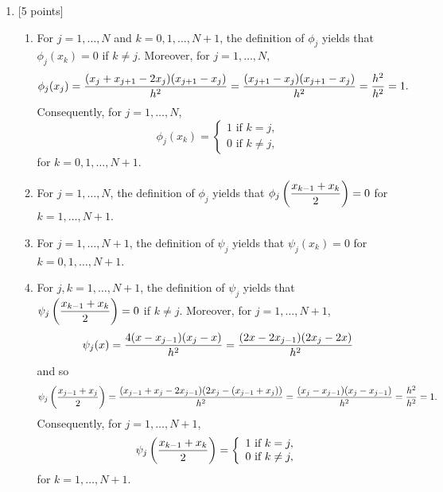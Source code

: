 \begin{solution}
\begin{enumerate}
\item {[5 points]}
\begin{enumerate}
\item For $j=1,\ldots,N$ and $k=0,1,\ldots,N+1$, the definition of $\phi_j$ yields that $\phi_j(x_k)=0$ if $k\ne j$. Moreover, for $j=1,\ldots,N$,
\[
\phi_j(x_j)={(x_j+x_{j+1}-2x_j)(x_{j+1}-x_j) \over h^2}={(x_{j+1}-x_j)(x_{j+1}-x_j) \over h^2}={h^2 \over h^2}=1.
\]
Consequently, for $j=1,\ldots,N$,
\[ \phi_j(x_k) = \left\{ \begin{array}{l}
1\mbox{ if }k=j, \\
0\mbox{ if }k\ne j,
\end{array}\right. \]
for $k=0,1,\ldots,N+1$.

\item For $j=1,\ldots,N$, the definition of $\phi_j$ yields that $\displaystyle{\phi_j\left({x_{k-1}+x_k \over 2}\right)=0}$ for $k=1,\ldots,N+1$.

\item For $j=1,\ldots,N+1$, the definition of $\psi_j$ yields that $\psi_j(x_k)=0$ for $k=0,1,\ldots,N+1$.

\item For $j,k=1,\ldots,N+1$, the definition of $\psi_j$ yields that $\displaystyle{\psi_j\left({x_{k-1}+x_k \over 2}\right)=0}$ if $k\ne j$. Moreover, for $j=1,\ldots,N+1$,
\[
\psi_j(x)={4(x-x_{j-1})(x_j-x) \over h^2}={(2x-2x_{j-1})(2x_j-2x) \over h^2}
\]
and so
\[
\psi_j\left({x_{j-1}+x_j \over 2}\right)={(x_{j-1}+x_j-2x_{j-1})(2x_j-(x_{j-1}+x_j)) \over h^2}={(x_j-x_{j-1})(x_j-x_{j-1}) \over h^2}={h^2 \over h^2}=1.
\]
Consequently, for $j=1,\ldots,N+1$,
\[ \psi_j\left({x_{k-1}+x_k \over 2}\right) = \left\{ \begin{array}{l}
1\mbox{ if }k=j, \\
0\mbox{ if }k\ne j,
\end{array}\right. \]
for $k=1,\ldots,N+1$.
\end{enumerate}


\end{enumerate}
\end{solution}
